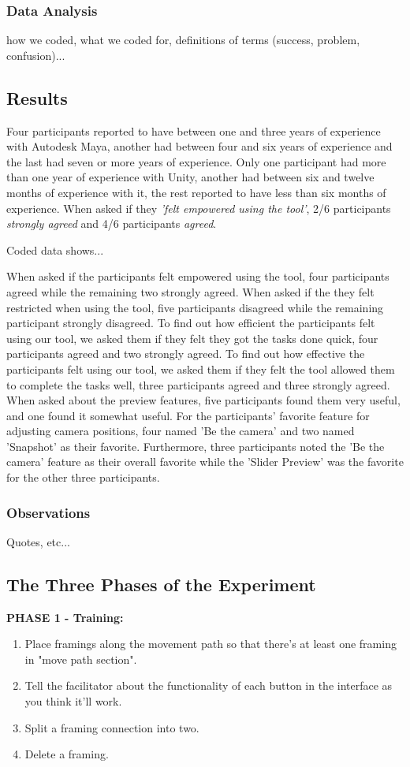 \subsubsection{Data Analysis}
how we coded, what we coded for, definitions of terms (success, problem, confusion)...

\subsection{Results} \label{results}
Four participants reported to have between one and three years of experience with Autodesk Maya, another had between four and six years of experience and the last had seven or more years of experience. Only one participant had more than one year of experience with Unity, another had between six and twelve months of experience with it, the rest reported to have less than six months of experience.
When asked if they \textit{'felt empowered using the tool'}, 2/6 participants \textit{strongly agreed} and 4/6 participants \textit{agreed}.

Coded data shows...

When asked if the participants felt empowered using the tool, four participants agreed while the remaining two strongly agreed. When asked if the they felt restricted when using the tool, five participants disagreed while the remaining participant strongly disagreed. To find out how efficient the participants felt using our tool, we asked them if they felt they got the tasks done quick, four participants agreed and two strongly agreed. To find out how effective the participants felt using our tool, we asked them if they felt the tool allowed them to complete the tasks well, three participants agreed and three strongly agreed.
When asked about the preview features, five participants found them very useful, and one found it somewhat useful. For the participants' favorite feature for adjusting camera positions, four named 'Be the camera' and two named 'Snapshot' as their favorite. Furthermore, three participants noted the 'Be the camera' feature as their overall favorite while the 'Slider Preview' was the favorite for the other three participants. 

\subsubsection{Observations}
Quotes, etc...

\subsection{The Three Phases of the Experiment}
\textbf{PHASE 1 - Training:}
\begin{enumerate}
\item Place framings along the movement path so that there's at least one framing in "move path section".
\item Tell the facilitator about the functionality of each button in the interface as you think it'll work.
\item Split a framing connection into two.
\item Delete a framing.
\end{enumerate}

